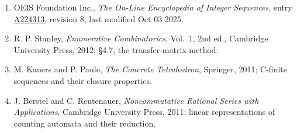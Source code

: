 \documentclass[11pt]{article}
\theoremstyle{definition}
\begin{document}
\begin{enumerate}

\item OEIS Foundation Inc., \emph{The On-Line Encyclopedia of Integer Sequences}, entry \href{https://oeis.org/A224313}{A224313}, revision 8, last modified Oct 03 2025.

\item R. P. Stanley, \emph{Enumerative Combinatorics}, Vol.~1, 2nd ed., Cambridge University Press, 2012; \S4.7, the transfer-matrix method.

\item M. Kauers and P. Paule, \emph{The Concrete Tetrahedron}, Springer, 2011; C-finite sequences and their closure properties.

\item J. Berstel and C. Reutenauer, \emph{Noncommutative Rational Series with Applications}, Cambridge University Press, 2011; linear representations of counting automata and their reduction.

\end{enumerate}
\end{document}
